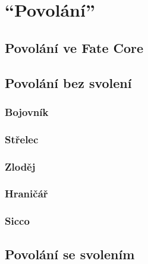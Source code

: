 \documentclass[../main.tex]{subfiles}
\begin{document}
\chapter{``Povolání''}
\label{chap:speciality}

\section{Povolání ve Fate Core}
\label{sec:povolani-fate-core}

\section{Povolání bez svolení}
\label{sec:pov-bez-svoleni}

\subsection{Bojovník}
\label{sec:pov-bojovnik}

\subsection{Střelec}
\label{sec:pov-strelec}

\subsection{Zloděj}
\label{sec:pov-zlodej}

\subsection{Hraničář}
\label{sec:pov-hranicar}

\subsection{Sicco}
\label{sec:pov-sicco}


\section{Povolání se svolením}
\label{sec:pov-se-svolenim}
\end{document}
